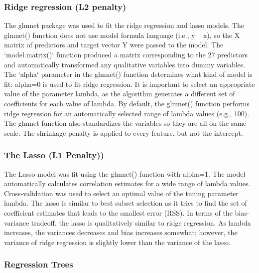 \documentclass[sigconf]{acmart}
\begin{document}

\subsubsection{Ridge regression (L2 penalty)} 

The glmnet package was used to fit the ridge regression and lasso models. 
The glmnet() function does not use model formula language (i.e., y ~ x), 
so the X matrix of predictors and target vector Y were passed to the model. 
The `model.matrix()` function produced a matrix corresponding to the 27 
predictors and automatically transformed any qualitative variables into
dummy variables. The `alpha` parameter in the glmnet() function determines 
what kind of model is fit: alpha=0 is used to fit ridge regression. It is
important to select an appropriate value of the parameter lambda, as the
algorithm generates a different set of coefficients for each value of 
lambda. By default, the glmnet() function performs ridge regression for an 
automatically selected range of lambda values (e.g., 100). The glmnet 
function also standardizes the variables so they are all on the same scale.
The shrinkage penalty is applied to every feature, but not the intercept. 


\subsubsection{The Lasso (L1 Penalty))} 
 
The Lasso model was fit using the glmnet() function with alpha=1. The model 
automatically calculates correlation estimates for a wide range of lambda 
values. Cross-validation was used to select an optimal value of the tuning 
parameter lambda. The lasso is similar to best subset selection as it tries 
to find the set of coefficient estimates that leads to the smallest error (RSS). 
In terms of the bias-variance tradeoff, the lasso is qualitatively similar to 
ridge regression. As lambda increases, the variances decreases and bias 
increases somewhat; however, the variance of ridge regression is slightly 
lower than the variance of the lasso. 
 

\subsubsection{Regression Trees} 
\end{document}
